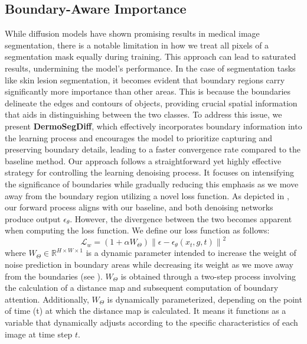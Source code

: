 \documentclass[runningheads]{llncs}
\begin{document}
\subsection{Boundary-Aware Importance}
While diffusion models have shown promising results in medical image segmentation, there is a notable limitation in how we treat all pixels of a segmentation mask equally during training. This approach can lead to saturated results, undermining the model's performance. In the case of segmentation tasks like skin lesion segmentation, it becomes evident that boundary regions carry significantly more importance than other areas. This is because the boundaries delineate the edges and contours of objects, providing crucial spatial information that aids in distinguishing between the two classes. To address this issue, we present \textbf{DermoSegDiff}, which effectively incorporates boundary information into the learning process and encourages the model to prioritize capturing and preserving boundary details, leading to a faster convergence rate compared to the baseline method. Our approach follows a straightforward yet highly effective strategy for controlling the learning denoising process. It focuses on intensifying the significance of boundaries while gradually reducing this emphasis as we move away from the boundary region utilizing a novel loss function. As depicted in , our forward process aligns with our baseline, and both denoising networks produce output $\epsilon_\theta$. However, the divergence between the two becomes apparent when computing the loss function. We define our loss function as follows:
\begin{equation}
    \mathcal{L}_{w} =(1 + \alpha W_{\Theta})  \left\|\epsilon-\epsilon_\theta\left(x_t, g, t\right)\right\|^2
\end{equation}
where $W_{\Theta} \in \mathbb{R}^{H\times W \times 1}$ is a dynamic parameter intended to increase the weight of noise prediction in boundary areas while decreasing its weight as we move away from the boundaries (see ). $W_{\Theta}$ is obtained through a two-step process involving the calculation of a distance map and subsequent computation of boundary attention. Additionally, $W_{\Theta}$ is dynamically parameterized, depending on the point of time (t) at which the distance map is calculated. It means it functions as a variable that dynamically adjusts according to the specific characteristics of each image at time step $t$.
\end{document}
